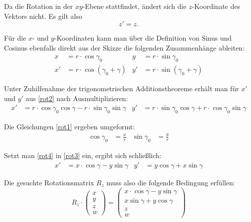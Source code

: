 Da die Rotation in der $xy$-Ebene stattfindet, ändert sich die $z$-Koordinate des Vektors nicht. Es gilt also
\begin{equation}
 z' = z.
\end{equation}

Für die $x$- und $y$-Koordinaten kann man über die Definition von Sinus und Cosinus ebenfalls direkt aus der Skizze die folgenden Zusammenhänge ableiten:
\begin{align}
  x &= r \cdot \cos{\gamma_0}            &   y &= r \cdot \sin{\gamma_0} \label{rot1} \\
 x' &= r \cdot \cos{(\gamma_0 + \gamma)} &  y' &= r \cdot \sin{(\gamma_0 + \gamma)} \label{rot2}
\end{align}

Unter Zuhilfenahme der trigonometrischen Additionstheoreme erhält man für $x'$ und $y'$ aus \ref{rot2} nach Ausmultiplizieren:
\begin{align}
 \label{rot3}
 x' &= r \cdot \cos \gamma_0 \cos \gamma - r \cdot \sin \gamma_0 \sin \gamma &  y' &= r \cdot \sin \gamma_0 \cos \gamma + r \cdot \cos \gamma_0 \sin \gamma
\end{align}

Die Gleichungen \ref{rot1} ergeben umgeformt:
\begin{align}
 \label{rot4}
 \cos \gamma_0 &= \frac{x}{r} & \sin \gamma_0 &= \frac{y}{r}
\end{align}

Setzt man \ref{rot4} in \ref{rot3} ein, ergibt sich schließlich:
\begin{align}
 x' &= x \cdot \cos \gamma - y \sin \gamma &  y' &= y \cos \gamma + x \sin \gamma
\end{align}

Die gesuchte Rotationsmatrix $R_{z}$ muss also die folgende Bedingung erfüllen:
\begin{equation}
 R_{z} \cdot
 \begin{pmatrix}
  x \\
  y \\
  z \\
  w
 \end{pmatrix}
 = 
 \begin{pmatrix}
  x \cdot \cos \gamma - y \sin \gamma \\
  x \sin \gamma + y \cos \gamma \\
  z \\
  w
 \end{pmatrix}
\end{equation}

